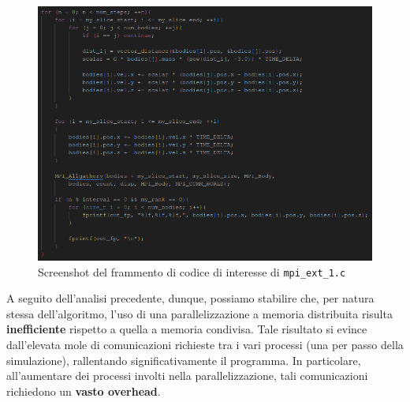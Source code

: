 \documentclass[12pt]{report}
\begin{document}
    \begin{figure}[H]
        \centering
        \includegraphics[width=\textwidth]{images/mpi_ext_1_3.png}
        \caption{Screenshot del frammento di codice di interesse di \texttt{mpi\_ext\_1.c}}
        \label{fig:mpi_ext_1_3}
    \end{figure}

    A seguito dell'analisi precedente, dunque, possiamo stabilire che, per natura stessa dell'algoritmo, l'uso di una parallelizzazione a memoria distribuita risulta \textbf{inefficiente} rispetto a quella a memoria condivisa. Tale risultato si evince dall'elevata mole di comunicazioni richieste tra i vari processi (una per passo della simulazione), rallentando significativamente il programma. In particolare, all'aumentare dei processi involti nella parallelizzazione, tali comunicazioni richiedono un \textbf{vasto overhead}.
\end{document}
